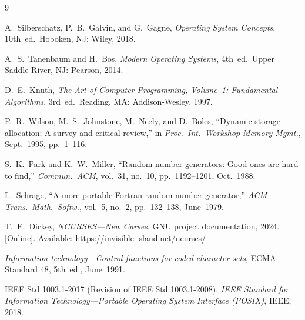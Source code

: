 \documentclass[conference]{IEEEtran}
\begin{document}
\FloatBarrier
\begin{thebibliography}{9}

A.~Silberschatz, P.~B.~Galvin, and G.~Gagne, \emph{Operating System Concepts}, 10th~ed.\ Hoboken, NJ: Wiley, 2018.

A.~S.~Tanenbaum and H.~Bos, \emph{Modern Operating Systems}, 4th~ed.\ Upper Saddle River, NJ: Pearson, 2014.

D.~E.~Knuth, \emph{The Art of Computer Programming, Volume~1: Fundamental Algorithms}, 3rd~ed.\ Reading, MA: Addison-Wesley, 1997.

P.~R.~Wilson, M.~S.~Johnstone, M.~Neely, and D.~Boles, ``Dynamic storage allocation: A survey and critical review,'' in \emph{Proc.\ Int.\ Workshop Memory Mgmt.}, Sept.~1995, pp.~1--116.

S.~K.~Park and K.~W.~Miller, ``Random number generators: Good ones are hard to find,'' \emph{Commun.\ ACM}, vol.~31, no.~10, pp.~1192--1201, Oct.~1988.

L.~Schrage, ``A more portable Fortran random number generator,'' \emph{ACM Trans.\ Math.\ Softw.}, vol.~5, no.~2, pp.~132--138, June~1979.

T.~E.~Dickey, \emph{NCURSES---New Curses}, GNU project documentation, 2024. [Online]. Available: \url{https://invisible-island.net/ncurses/}

\emph{Information technology---Control functions for coded character sets}, ECMA Standard 48, 5th~ed., June~1991.

IEEE Std 1003.1-2017 (Revision of IEEE Std 1003.1-2008), \emph{IEEE Standard for Information Technology---Portable Operating System Interface (POSIX)}, IEEE, 2018.

\end{thebibliography}
\end{document}
